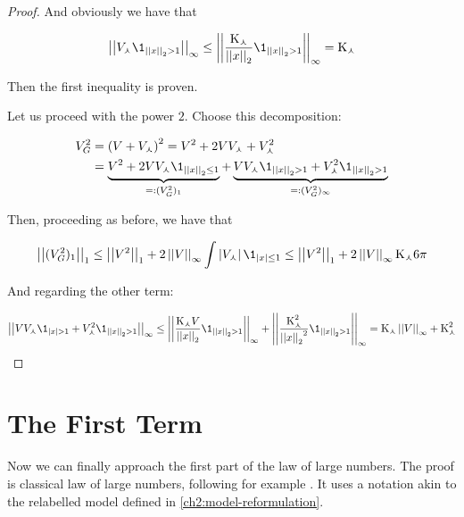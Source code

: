 \begin{proof}
	And obviously we have that
	
	\begin{equation*}
		\Norm{\cutoffSinAttraction \1_{\Normp{2}{x} > 1}}_\infty 
		\leq 
		\Norm{\frac{\const_\curlywedge}{\Normp{2}{x}} \1_{\Normp{2}{x} > 1}}_\infty  = \const_\curlywedge
	\end{equation*}
	
	Then the first inequality is proven.
	
	Let us proceed with the power $2$.
	Choose this decomposition:
	
	\begin{align*}
		\genAttraction^2 
		&= 
		\left(
		\attraction + \cutoffSinAttraction
		\right)^2
		= \attraction^2 + 2 \attraction \cutoffSinAttraction + \cutoffSinAttraction^2 
		\\
		& = 
		\underbrace{ 
			\attraction^2 + 2 \attraction \cutoffSinAttraction \1_{\Normp{2}{x} \leq 1}
		}_{=:(\genAttraction^2)_1}
		+
		\underbrace{
			\attraction \cutoffSinAttraction \1_{\Normp{2}{x} > 1}
			+ \cutoffSinAttraction^2 \1_{\Normp{2}{x} > 1}
		}_{=:(\genAttraction^2)_\infty}
	\end{align*}
	
	Then, proceeding as before, we have that
	
	\begin{equation*}
		\Norm{(\genAttraction^2)_1}_1 
		\leq
		\Norm{\attraction^2}_1 + 2 \Norm{\attraction}_\infty \int \norm{\cutoffSinAttraction}  \1_{\norm{x} \leq 1}
		\leq \Norm{\attraction^2}_1 + 2 \Norm{\attraction}_\infty \const_\curlywedge 6\pi
	\end{equation*}
	
	And regarding the other term:
	
	\begin{equation*}
		\Norm{\attraction \cutoffSinAttraction \1_{\norm{x} > 1}
			+ \cutoffSinAttraction^2 \1_{\Normp{2}{x} > 1}}_\infty 
		\leq 
		\Norm{\frac{\const_\curlywedge \attraction}{\Normp{2}{x}} \1_{\Normp{2}{x} > 1}}_\infty + \Norm{\frac{\const_\curlywedge^2}{\Normp{2}{x}^2} \1_{\Normp{2}{x} > 1}}_\infty  = \const_\curlywedge\Norm{\attraction}_\infty + \const_\curlywedge^2
	\end{equation*}
\end{proof}


\section{The First Term}

Now we can finally approach the first part of the law of large numbers.
The proof is classical law of large numbers, following for example \autocite{ana}.
It uses a notation akin to the relabelled model defined in \ref{ch2:model-reformulation}.

